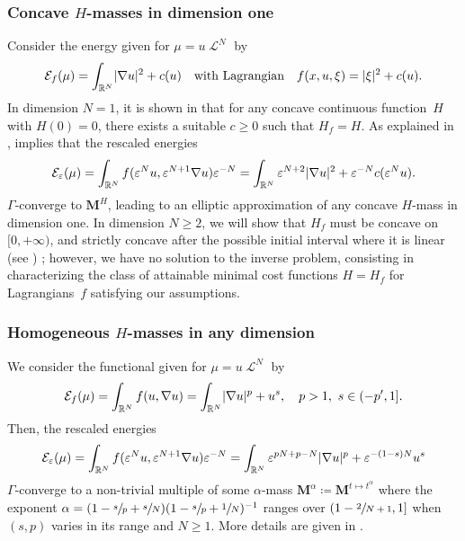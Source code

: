 \documentclass[10pt]{amsart}
\theoremstyle{plain}
\theoremstyle{definition}
\newcommand{\R}{\mathbb{R}}
\newcommand{\ener}{\mathcal{E}}
\newcommand{\mass}{\boldsymbol{M}}
\newcommand{\eps}{\varepsilon}
\DeclarePairedDelimiter{\abs}{\lvert}{\rvert}
\DeclareMathOperator{\lbm}{\mathcal{L}}
\begin{document}
\subsubsection*{Concave \(H\)-masses in dimension one} Consider the energy given for $\mu = u\lbm^N$ by
\[\ener_f(\mu) = \int_{\R^N} \abs{\nabla u}^2 + c(u)\quad\text{with Lagrangian}\quad f(x,u,\xi) = \abs{\xi}^2 + c(u).\]
In dimension $N =1$, it is shown in \cite{wirthPhaseFieldModels2019} that for any concave continuous function~\(H\) with \(H(0)=0\), there exists a suitable $c \geq 0$ such that \(H_f=H\). As explained in ,  implies that the rescaled energies
\begin{equation}
\ener_\eps(\mu) = \int_{\R^N} f(\eps^N u,\eps^{N+1}\nabla u) \eps^{-N}= \int_{\R^N} \eps^{N+2}\abs{\nabla u}^2+\eps^{-N}c(\eps^N u).
\end{equation}
$\Gamma$-converge to $\mass^{H}$, leading to an elliptic approximation of any concave $H$-mass in dimension one. In dimension \(N\geq 2\), we will show that $H_f$ must be concave on $[0,+\infty)$, and strictly concave after the possible initial interval where it is linear (see ) ; however, we have no solution to the inverse problem, consisting in characterizing the class of attainable minimal cost functions \(H=H_f\) for Lagrangians~$f$ satisfying our assumptions.

\subsubsection*{Homogeneous \(H\)-masses in any dimension} We consider the functional given for $\mu = u \lbm^N$ by
\begin{equation}
\ener_{f}(\mu) = \int_{\R^N} f(u,\nabla u) = \int_{\R^N} \abs{\nabla u}^p + u^s,\quad p>1,\ s\in (-p',1].
\end{equation}
Then, the rescaled energies
\[\ener_\eps(\mu) = \int_{\R^N} f(\eps^N u,\eps^{N+1}\nabla u) \eps^{-N}= \int_{\R^N} \eps^{pN+p-N}\abs{\nabla u}^p+\eps^{-(1-s)N}u^s\]
$\Gamma$-converge to a non-trivial multiple of some $\alpha$-mass $\mass^\alpha \coloneqq \mass^{t\mapsto t^\alpha}$ where the exponent $\alpha = (1 -\sfrac sp + \sfrac sN)(1 -\sfrac sp + \sfrac 1N)^{-1}$ ranges over $(1-\sfrac{2}{N+1},1]$ when $(s,p)$ varies in its range and $N\geq 1$. More details are given in .
\end{document}
